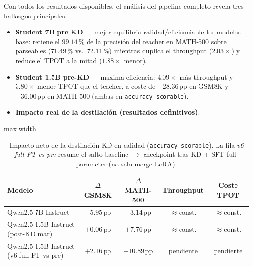\documentclass[11pt,a4paper]{article}
\begin{document}
Con todos los resultados disponibles, el an\'alisis del pipeline completo
revela tres hallazgos principales:

\begin{itemize}

  \item \textbf{Student 7B pre-KD} --- mejor equilibrio calidad/eficiencia
    de los modelos base:
    retiene el $\mathbf{99.14\,\%}$ de la precisi\'on del teacher en
    MATH-500 sobre parseables (71.49\,\% vs.\ 72.11\,\%) mientras duplica el throughput
    ($2.03\times$) y reduce el TPOT a la mitad ($1.88\times$ menor).

  \item \textbf{Student 1.5B pre-KD} --- m\'axima eficiencia:
    $4.09\times$ m\'as throughput y $3.80\times$ menor TPOT que el teacher,
    a coste de $-28.36$\,pp en GSM8K y $-36.00$\,pp en MATH-500 (ambas en \texttt{accuracy\_scorable}).

  \item \textbf{Impacto real de la destilaci\'on (resultados definitivos)}:
\end{itemize}

\begin{table}[H]
\centering
\caption{Impacto neto de la destilaci\'on KD en calidad (\texttt{accuracy\_scorable}). La fila
         \emph{v6 full-FT vs pre} resume el salto baseline $\to$ checkpoint
         tras KD + SFT full-parameter (no solo merge LoRA).}
\label{tab:kd-impact}
\begin{adjustbox}{max width=\textwidth}
\begin{tabular}{lcccc}
\toprule
\textbf{Modelo} & \textbf{$\Delta$ GSM8K} & \textbf{$\Delta$ MATH-500}
  & \textbf{Throughput} & \textbf{Coste TPOT} \\
\midrule
Qwen2.5-7B-Instruct   & $-5.95$\,pp & $-3.14$\,pp & $\approx$const. & $\approx$const. \\
Qwen2.5-1.5B-Instruct (post-KD mar) & $\mathbf{+0.06}$\,pp & $\mathbf{+7.76}$\,pp & $\approx$const. & $\approx$const. \\
Qwen2.5-1.5B-Instruct (v6 full-FT vs pre) & $\mathbf{+2.16}$\,pp & $\mathbf{+10.89}$\,pp & pendiente & pendiente \\
\bottomrule
\end{tabular}
\end{adjustbox}
\end{table}
\end{document}
